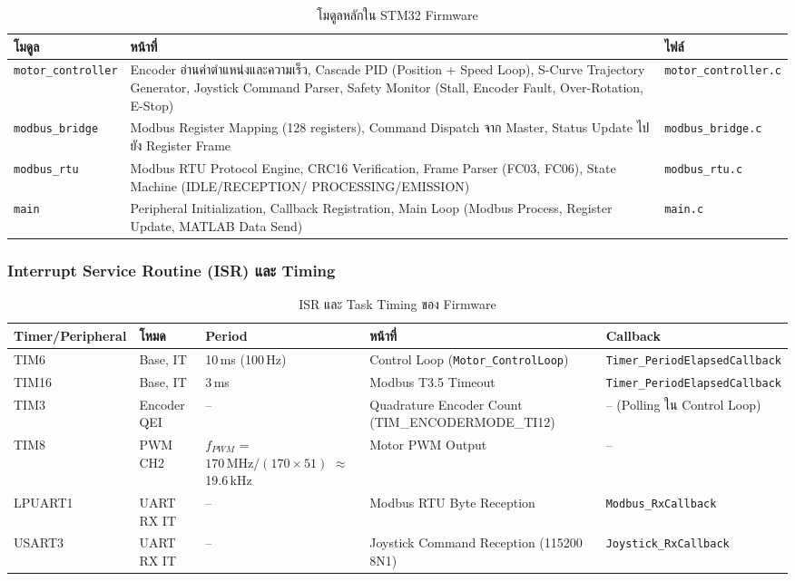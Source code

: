 \begin{table}[H]
  \centering
  \caption{โมดูลหลักใน STM32 Firmware}
  \label{tab:firmware_modules}
  \begin{tabular}{lp{7cm}l}
    \toprule
    โมดูล & หน้าที่ & ไฟล์ \\
    \midrule
    \texttt{motor\_controller} &
      Encoder อ่านค่าตำแหน่งและความเร็ว,
      Cascade PID (Position + Speed Loop),
      S-Curve Trajectory Generator,
      Joystick Command Parser,
      Safety Monitor (Stall, Encoder Fault,
      Over-Rotation, E-Stop) &
      \texttt{motor\_controller.c} \\
    \addlinespace
    \texttt{modbus\_bridge} &
      Modbus Register Mapping (128 registers),
      Command Dispatch จาก Master,
      Status Update ไปยัง Register Frame &
      \texttt{modbus\_bridge.c} \\
    \addlinespace
    \texttt{modbus\_rtu} &
      Modbus RTU Protocol Engine,
      CRC16 Verification,
      Frame Parser (FC03, FC06),
      State Machine (IDLE/RECEPTION/
      PROCESSING/EMISSION) &
      \texttt{modbus\_rtu.c} \\
    \addlinespace
    \texttt{main} &
      Peripheral Initialization,
      Callback Registration,
      Main Loop (Modbus Process,
      Register Update, MATLAB Data Send) &
      \texttt{main.c} \\
    \bottomrule
  \end{tabular}
\end{table}

\subsubsection{Interrupt Service Routine (ISR) และ Timing}
\label{subsubsec:isr_and_timing}

\begin{table}[H]
  \centering
  \caption{ISR และ Task Timing ของ Firmware}
  \label{tab:isr_timing}
  \begin{tabular}{lllll}
    \toprule
    Timer/Peripheral & โหมด & Period & หน้าที่ & Callback \\
    \midrule
    TIM6  & Base, IT   & 10\,ms (100\,Hz) &
      Control Loop (\texttt{Motor\_ControlLoop}) &
      \texttt{Timer\_PeriodElapsedCallback} \\
    TIM16 & Base, IT   & 3\,ms &
      Modbus T3.5 Timeout &
      \texttt{Timer\_PeriodElapsedCallback} \\
    TIM3  & Encoder QEI & -- &
      Quadrature Encoder Count (TIM\_ENCODERMODE\_TI12) &
      -- (Polling ใน Control Loop) \\
    TIM8  & PWM CH2    & $f_{PWM}$ = \(170\,\text{MHz} / (170 \times 51)\) $\approx$ 19.6\,kHz &
      Motor PWM Output &
      -- \\
    LPUART1 & UART RX IT & -- &
      Modbus RTU Byte Reception &
      \texttt{Modbus\_RxCallback} \\
    USART3  & UART RX IT & -- &
      Joystick Command Reception (115200\,8N1) &
      \texttt{Joystick\_RxCallback} \\
    \bottomrule
  \end{tabular}
\end{table}

